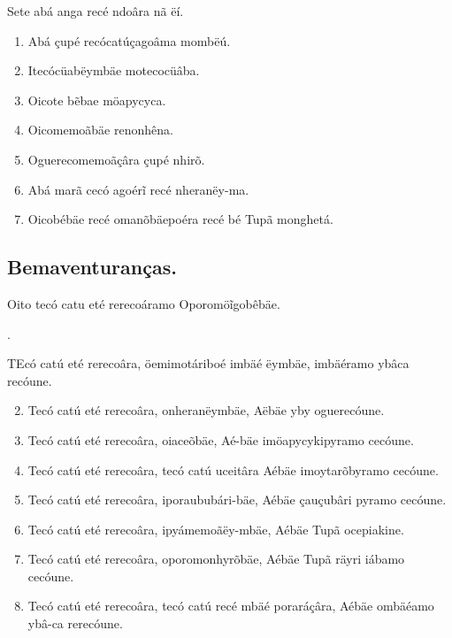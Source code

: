 \documentclass[openany,titlepage,12pt]{book}
\newcommand{\comecalista}[5]{
    \hspace*{-11.7pt}
    \begin{minipage}[t]{0.08\linewidth}
        \flushright #1\\#2
    \end{minipage}
    \hspace{0pt}
    \begin{minipage}[t]{0.94\linewidth}
        \lettrine
        [findent =2pt, nindent=0pt,  lines=2]
        {#3}{#4}#5
    \end{minipage}
    \vspace*{-3pt}
}
\begin{document}
\noindent Sete abá anga recé ndoâra nã ëí.
\begin{enumerate}
    \item Abá çupé recócatúçagoâma mombëú.
    \item Itecócüabëymbäe motecocüâba.
    \item Oicote bẽbae möapycyca.
    \item Oicomemoãbäe renonhêna.
    \item Oguerecomemoãçâra çupé nhirõ.
    \item Abá marã cecó agoérĩ recé nheranëy-\linebreak ma.
    \item Oicobébäe recé omanõbäepoéra recé bé Tupã monghetá.
\end{enumerate}

\subsection{Bemaventuranças.}
\begin{center}
    Oito tecó catu eté rerecoáramo Oporomöĩgobêbäe.    
\end{center}
\unskip
\comecalista{1.}{}{T}{E}
    {có catú eté rerecoâra, öemimotáriboé imbäé ëymbäe,
    imbäéramo ybâca recóune.}
\begin{enumerate}
    \setcounter{enumi}{1}
    \item Tecó catú eté rerecoâra, onheranëymbäe, Aëbäe
    yby oguerecóune.
    \item Tecó catú eté rerecoâra, oiaceõbäe, Aé-bäe
    imöapycykipyramo cecóune.
    \item Tecó catú eté rerecoâra, tecó catú uceitâra
    Aébäe imoytarõbyramo cecóune.
    \item Tecó catú eté rerecoâra, iporaububári-\linebreak bäe,
    Aébäe çauçubâri pyramo cecóune. 
    \item Tecó catú eté rerecoâra, ipyámemoãëy-mbäe,
    Aébäe Tupã ocepiakine.
    \item Tecó catú eté rerecoâra, oporomonhyrõbäe,
    Aébäe Tupã räyri iábamo cecóune.
    \item Tecó catú eté rerecoâra, tecó catú recé
    mbäé poraráçâra, Aébäe ombäéamo ybâ-ca rerecóune.
\end{enumerate}
\end{document}
